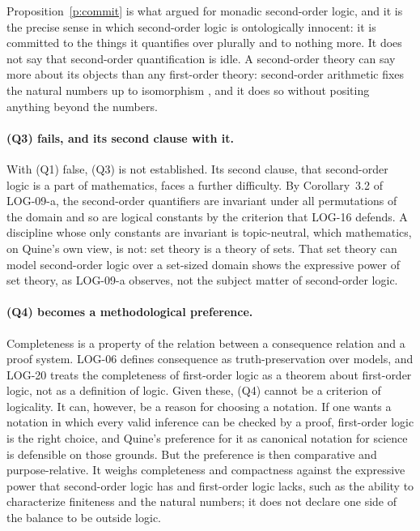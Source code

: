 \documentclass{situationist-preprint}
\begin{document}
Proposition~\ref{p:commit} is what \citet{Boolos1984} argued for monadic second-order logic, and it is the precise sense in which second-order logic is ontologically innocent: it is committed to the things it quantifies over plurally and to nothing more. It does not say that second-order quantification is idle. A second-order theory can say more about its objects than any first-order theory: second-order arithmetic fixes the natural numbers up to isomorphism \citep{Dedekind1888}, and it does so without positing anything beyond the numbers.

\paragraph{(Q3) fails, and its second clause with it.} With (Q1) false, (Q3) is not established. Its second clause, that second-order logic is a part of mathematics, faces a further difficulty. By Corollary~3.2 of LOG-09-a, the second-order quantifiers are invariant under all permutations of the domain and so are logical constants by the criterion that LOG-16 defends. A discipline whose only constants are invariant is topic-neutral, which mathematics, on Quine's own view, is not: set theory is a theory of sets. That set theory can model second-order logic over a set-sized domain shows the expressive power of set theory, as LOG-09-a observes, not the subject matter of second-order logic.

\paragraph{(Q4) becomes a methodological preference.} Completeness is a property of the relation between a consequence relation and a proof system. LOG-06 defines consequence as truth-preservation over models, and LOG-20 treats the completeness of first-order logic as a theorem about first-order logic, not as a definition of logic. Given these, (Q4) cannot be a criterion of logicality. It can, however, be a reason for choosing a notation. If one wants a notation in which every valid inference can be checked by a proof, first-order logic is the right choice, and Quine's preference for it as canonical notation for science is defensible on those grounds. But the preference is then comparative and purpose-relative. It weighs completeness and compactness against the expressive power that second-order logic has and first-order logic lacks, such as the ability to characterize finiteness and the natural numbers; it does not declare one side of the balance to be outside logic.
\end{document}

